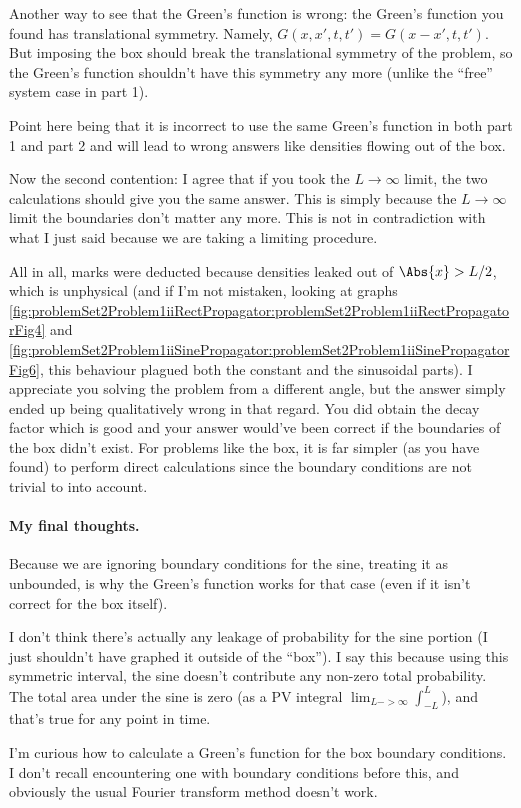 {Another way to see that the Green's function is wrong: the Green's function you found has translational symmetry.  Namely, $G(x,x',t,t') = G(x-x',t,t')$.  But imposing the box should break the translational symmetry of the problem, so the Green's function shouldn't have this symmetry any more (unlike the ``free'' system case in part 1).

Point here being that it is incorrect to use the same Green's function in both part 1 and part 2 and will lead to wrong answers like densities flowing out of the box.

Now the second contention: I agree that if you took the $L \rightarrow \infty$ limit, the two calculations should give you the same answer.  This is simply because the $L \rightarrow \infty$ limit the boundaries don't matter any more.  This is not in contradiction with what I just said because we are taking a limiting procedure.

All in all, marks were deducted because densities leaked out of $\Abs{x} > L/2$, which is unphysical (and if I'm not mistaken, looking at graphs \cref{fig:problemSet2Problem1iiRectPropagator:problemSet2Problem1iiRectPropagatorFig4} and \cref{fig:problemSet2Problem1iiSinePropagator:problemSet2Problem1iiSinePropagatorFig6}, this behaviour plagued both the constant and the sinusoidal parts).  I appreciate you solving the problem from a different angle, but the answer simply ended up being qualitatively wrong in that regard.  You did obtain the decay factor which is good and your answer would've been correct if the boundaries of the box didn't exist.  For problems like the box, it is far simpler (as you have found) to perform direct calculations since the boundary conditions are not trivial to into account.

\paragraph{My final thoughts.}

Because we are ignoring boundary conditions for the sine, treating it as unbounded, is why the Green's function works for that case (even if it isn't correct for the box itself).

I don't think there's actually any leakage of probability for the sine portion (I just shouldn't have graphed it outside of the ``box'').  I say this because using this symmetric interval, the sine doesn't contribute any non-zero total probability.  The total area under the sine is zero (as a PV integral $\lim_{L->\infty} \int_{-L}^L$), and that's true for any point in time.

I'm curious how to calculate a Green's function for the box boundary conditions.  I don't recall encountering one with boundary conditions before this, and obviously the usual Fourier transform method doesn't work.
}
